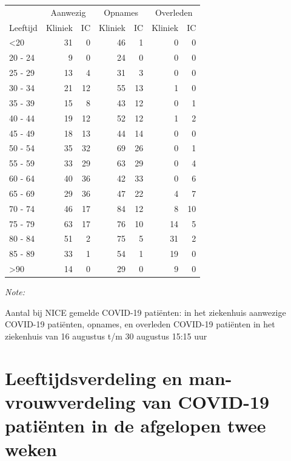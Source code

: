 \documentclass[
  english,
  man,floatsintext]{apa6}
\begin{document}
\begin{table}
\centering\begingroup\fontsize{10}{12}\selectfont

\begin{threeparttable}
\begin{tabular}{lrrrrrr}
\toprule
\multicolumn{1}{c}{ } & \multicolumn{2}{c}{Aanwezig} & \multicolumn{2}{c}{Opnames} & \multicolumn{2}{c}{Overleden} \\
\cmidrule(l{3pt}r{3pt}){2-3} \cmidrule(l{3pt}r{3pt}){4-5} \cmidrule(l{3pt}r{3pt}){6-7}
Leeftijd & Kliniek & IC & Kliniek & IC & Kliniek & IC\\
\midrule
<20 & 31 & 0 & 46 & 1 & 0 & 0\\
20 - 24 & 9 & 0 & 24 & 0 & 0 & 0\\
25 - 29 & 13 & 4 & 31 & 3 & 0 & 0\\
30 - 34 & 21 & 12 & 55 & 13 & 1 & 0\\
35 - 39 & 15 & 8 & 43 & 12 & 0 & 1\\
40 - 44 & 19 & 12 & 52 & 12 & 1 & 2\\
45 - 49 & 18 & 13 & 44 & 14 & 0 & 0\\
50 - 54 & 35 & 32 & 69 & 26 & 0 & 1\\
55 - 59 & 33 & 29 & 63 & 29 & 0 & 4\\
60 - 64 & 40 & 36 & 42 & 33 & 0 & 6\\
65 - 69 & 29 & 36 & 47 & 22 & 4 & 7\\
70 - 74 & 46 & 17 & 84 & 12 & 8 & 10\\
75 - 79 & 63 & 17 & 76 & 10 & 14 & 5\\
80 - 84 & 51 & 2 & 75 & 5 & 31 & 2\\
85 - 89 & 33 & 1 & 54 & 1 & 19 & 0\\
>90 & 14 & 0 & 29 & 0 & 9 & 0\\
\bottomrule
\end{tabular}
\begin{tablenotes}
\item \textit{Note: } 
\item Aantal bij NICE gemelde COVID-19 patiënten: in het ziekenhuis aanwezige COVID-19 patiënten, opnames, en overleden COVID-19 patiënten in het ziekenhuis van 16 augustus t/m 30 augustus 15:15 uur
\end{tablenotes}
\end{threeparttable}
\endgroup{}
\end{table}

\newpage

\hypertarget{leeftijdsverdeling-en-man-vrouwverdeling-van-covid-19-patiuxebnten-in-de-afgelopen-twee-weken}{%
\section{Leeftijdsverdeling en man-vrouwverdeling van COVID-19 patiënten in de afgelopen twee weken}\label{leeftijdsverdeling-en-man-vrouwverdeling-van-covid-19-patiuxebnten-in-de-afgelopen-twee-weken}}
\end{document}
